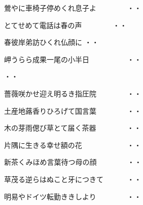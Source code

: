 \begin{shiika}
\begin{shiika}鶯やに車椅子停めくれ息子よ　　　　
\hfill{・・}\end{shiika}

\begin{shiika}とてせめて電話は春の声　　　　
\hfill{・・}\end{shiika}

\begin{shiika}春彼岸弟訪ひくれ仏顔に
\hfill{・・}\end{shiika}

\begin{shiika}岬うらら成果一尾の小半日　　　　　
\hfill{・・}\end{shiika}

\hfill{・・}\end{shiika}

\begin{shiika}薔薇咲かせ迎え明るき指圧院　　　　
\hfill{・・}\end{shiika}

\begin{shiika}土産地蕗香りひろげて国言葉　　　　
\hfill{・・}\end{shiika}

\begin{shiika}木の芽雨偲び草とて届く茶器　　　　
\hfill{・・}\end{shiika}

\begin{shiika}片隅に生きる幸せ額の花　　　　　　
\hfill{・・}\end{shiika}

\begin{shiika}新茶くみほめ言葉待つ母の顔　　　　
\hfill{・・}\end{shiika}

\begin{shiika}草茂る逆らはぬこと牙につきて　　　
\hfill{・・}\end{shiika}

\begin{shiika}明易やドイツ転勤ききしより　　　　
\hfill{・・}\end{shiika}

